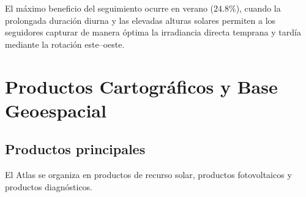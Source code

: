 \documentclass[11pt,a4paper]{article}
\begin{document}
El máximo beneficio del seguimiento ocurre en verano ($24.8\%$), cuando la prolongada duración diurna y las elevadas alturas solares permiten a los seguidores capturar de manera óptima la irradiancia directa temprana y tardía mediante la rotación este--oeste.



\section{Productos Cartográficos y Base Geoespacial}

\subsection{Productos principales}

El Atlas se organiza en productos de recurso solar, productos fotovoltaicos y productos diagnósticos.
\end{document}
